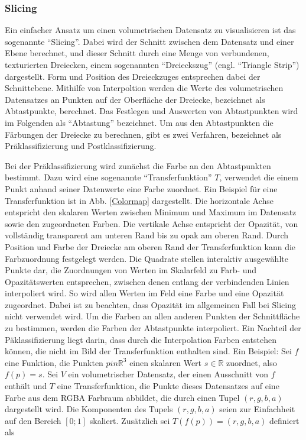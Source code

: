 \documentclass[a4paper,fontsize=12pt,toc=bib,halfparskip]{scrartcl}
\begin{document}
\subsubsection{Slicing}
\label{sec:Slicing}
Ein einfacher Ansatz um einen volumetrischen Datensatz zu visualisieren ist das sogenannte ``Slicing''\cite{munzner2014visualization}. Dabei wird der Schnitt zwischen dem Datensatz und einer Ebene berechnet, und dieser Schnitt durch eine Menge von verbundenen, texturierten Dreiecken, einem sogenannten ``Dreieckszug'' (engl. ``Triangle Strip'') dargestellt. Form und Position des Dreieckzuges entsprechen dabei der Schnittebene. Mithilfe von Interpoltion werden die Werte des volumetrischen Datensatzes an Punkten auf der Oberfl\"ache der Dreiecke, bezeichnet als Abtastpunkte, berechnet. Das Festlegen und Auswerten von Abtastpunkten wird im Folgenden als ``Abtastung'' bezeichnet. Um aus den Abtastpunkten die F\"arbungen der Dreiecke zu berechnen, gibt es zwei Verfahren, bezeichnet als Pr\"aklassifizierung und Postklassifizierung.

Bei der Pr\"aklassifizierung wird zun\"achst die Farbe  an den Abtastpunkten bestimmt. Dazu wird eine sogenannte ``Transferfunktion'' $T$, verwendet die einem Punkt anhand seiner Datenwerte eine Farbe zuordnet. Ein Beispiel f\"ur eine Transferfunktion ist in Abb. \ref{Colormap} dargestellt. Die horizontale Achse entspricht den skalaren Werten zwischen Minimum und Maximum im Datensatz sowie den zugeordneten Farben. Die vertikale Achse entspricht der Opazit\"at, von vollst\"andig transparent am unteren Rand bis zu opak am oberen Rand. Durch Position und Farbe der Dreiecke am oberen Rand der Transferfunktion kann die Farbzuordnung festgelegt werden. Die Quadrate stellen interaktiv ausgew\"ahlte Punkte dar, die Zuordnungen von Werten im Skalarfeld zu Farb- und Opazit\"atswerten entsprechen, zwischen denen entlang der verbindenden Linien interpoliert wird. So wird allen Werten im Feld eine Farbe und eine Opazit\"at zugeordnet. Dabei ist zu beachten, dass Opazit\"at im allgemeinen Fall bei Slicing nicht verwendet wird. Um die Farben an allen anderen Punkten der Schnittfl\"ache zu bestimmen, werden die Farben der Abtastpunkte interpoliert. Ein Nachteil der P\"aklassifizierung liegt darin, dass durch die Interpolation Farben entstehen k\"onnen, die nicht im Bild der Transferfunktion enthalten sind. Ein Beispiel: Sei $f$ eine Funktion, die Punkten $p in \mathbb{R}^3$ einen skalaren Wert $s \in \mathbb{R}$ zuordnet, also $f(p) = s$. Sei $V$ ein volumetrischer Datensatz, der einen Ausschnitt von $f$ enth\"alt und $T$ eine Transferfunktion, die Punkte dieses Datensatzes auf eine Farbe aus dem RGBA Farbraum abbildet, die durch einen Tupel $(r,g,b,a)$ dargestellt wird. Die Komponenten des Tupels $(r,g,b,a)$ seien zur Einfachheit auf den Bereich $[0;1]$ skaliert. Zus\"atzlich sei $T(f(p)) = (r,g,b,a)$ definiert als 
\end{document}
